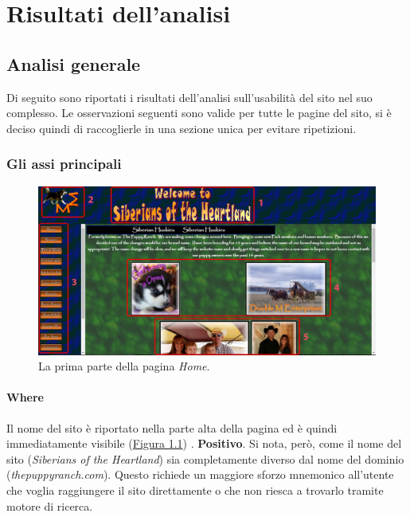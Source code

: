 \documentclass[../rapporto-usabilita.tex]{subfiles}
\begin{document}
\section{Risultati dell'analisi}
	\subsection{Analisi generale}
	\label{sec:analisigenerale}
	
	Di seguito sono riportati i risultati dell'analisi sull'usabilità del sito nel suo complesso. Le osservazioni seguenti sono valide per tutte le pagine del sito, si è deciso quindi di raccoglierle in una sezione unica per evitare ripetizioni.
	
		\subsubsection{Gli assi principali}
			
			\begin{figure}[!h]
			\centering
				\includegraphics[scale=0.33]{immagini/home_focus.jpg}
				\caption{La prima parte della pagina \textit{Home}.}
				\label{fig:homefocus}
			\end{figure}	
		
			\paragraph{Where}
				Il nome del sito è riportato nella parte alta della pagina ed è quindi immediatamente visibile (\hyperref[fig:homefocus]{Figura 1.1}) . \textbf{Positivo}. Si nota, però, come il nome del sito (\textit{Siberians of the Heartland}) sia completamente diverso dal nome del dominio (\textit{thepuppyranch.com}). Questo richiede un maggiore sforzo mnemonico all'utente che voglia raggiungere il sito direttamente o che non riesca a trovarlo tramite motore di ricerca.
				
\end{document}
